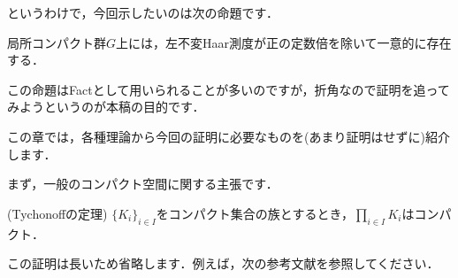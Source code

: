 というわけで，今回示したいのは次の命題です．
\begin{prop}[Haar測度の存在と一意性]
局所コンパクト群$G$上には，左不変Haar測度が正の定数倍を除いて一意的に存在する．
\end{prop}
この命題はFactとして用いられることが多いのですが，折角なので証明を追ってみようというのが本稿の目的です．

この章では，各種理論から今回の証明に必要なものを(あまり証明はせずに)紹介します．

まず，一般のコンパクト空間に関する主張です．

\begin{thm}(Tychonoffの定理)
$\{ K_i \} _{i \in I}$をコンパクト集合の族とするとき，$\prod_{i \in I} K_i$はコンパクト．
\end{thm}
この証明は長いため省略します．例えば，次の参考文献を参照してください．

